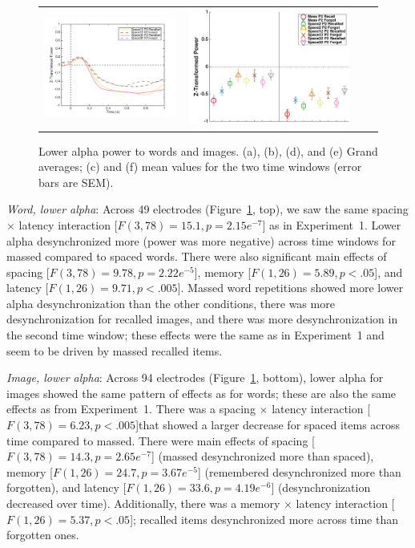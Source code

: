 \begin{figure}[H]
\begin{tabular}{cccc}
  \includegraphics[width=.30\textwidth]{./figs/exp2/tfr_line/tfr_line_ga_img_rc_spac12_p2_img_fo_spac12_p2_img_rc_spac32_p2_img_fo_spac32_p2_8_10_-100_1000_94ROIs_legend} &
  \includegraphics[width=.30\textwidth]{./figs/exp2/tfr_avg/tfr_avg_ga_img_rc_mass_p2_img_fo_mass_p2_img_rc_spac2_p2_img_fo_spac2_p2_img_rc_spac12_p2_img_fo_spac12_p2_img_rc_spac32_p2_img_fo_spac32_p2_8_10_0_500_500_1000_94ROI_ylabel} \\
  \end{tabular}
  \caption{Lower alpha power to words and images.  (a), (b), (d), and (e) Grand averages; (c) and (f) mean values for the two time windows (error bars are SEM).}
  \label{fig:s2_word_img_alpha_low}
\end{figure}


\textit{Word, lower alpha}: Across 49 electrodes (Figure~\ref{fig:s2_word_img_alpha_low}, top), we saw the same spacing $\times$ latency interaction [$F(3,78)=15.1, p=2.15e^{-7}$] as in Experiment~1.  Lower alpha desynchronized more (power was more negative) across time windows for massed compared to spaced words.  There were also significant main effects of spacing [$F(3,78)=9.78, p=2.22e^{-5}$], memory [$F(1,26)=5.89, p<.05$], and latency [$F(1,26)=9.71, p<.005$].  Massed word repetitions showed more lower alpha desynchronization than the other conditions, there was more desynchronization for recalled images, and there was more desynchronization in the second time window; these effects were the same as in Experiment~1 and seem to be driven by massed recalled items.


\textit{Image, lower alpha}: Across 94 electrodes (Figure~\ref{fig:s2_word_img_alpha_low}, bottom), lower alpha for images showed the same pattern of effects as for words; these are also the same effects as from Experiment~1.  There was a spacing $\times$ latency interaction [$F(3,78)=6.23, p<.005$]that showed a larger decrease for spaced items across time compared to massed.  There were main effects of spacing [$F(3,78)=14.3, p=2.65e^{-7}$] (massed desynchronized more than spaced), memory [$F(1,26)=24.7, p=3.67e^{-5}$] (remembered desynchronized more than forgotten), and latency [$F(1,26)=33.6, p=4.19e^{-6}$] (desynchronization decreased over time).  Additionally,  there was a memory $\times$ latency interaction [$F(1,26)=5.37, p<.05$]; recalled items desynchronized more across time than forgotten ones.


